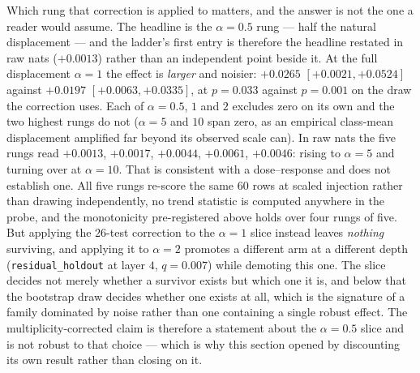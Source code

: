 Which rung that correction is applied to matters, and the answer is not the one a reader would
assume. The headline is the $\alpha = 0.5$ rung --- half the natural displacement --- and the
ladder's first entry is therefore the headline restated in raw nats ($+0.0013$) rather than an
independent point beside it. At the full displacement $\alpha = 1$ the effect is \emph{larger} and
noisier: $+0.0265$ \nolinebreak[3]$[+0.0021, +0.0524]$ against $+0.0197$
\nolinebreak[3]$[+0.0063, +0.0335]$, at $p = 0.033$ against $p = 0.001$ on the draw the correction uses. Each of $\alpha = 0.5$, $1$
and $2$ excludes zero on its own and the two highest rungs do not ($\alpha = 5$ and $10$ span zero,
as an empirical class-mean displacement amplified far beyond its observed scale can). In raw nats
the five rungs read $+0.0013$, $+0.0017$, $+0.0044$, $+0.0061$, $+0.0046$: rising to $\alpha = 5$
and turning over at $\alpha = 10$. That is consistent with a dose--response and does not establish
one. All five rungs re-score the same $60$ rows at scaled injection rather than drawing
independently, no trend statistic is computed anywhere in the probe, and the monotonicity
pre-registered above holds over four rungs of five. But applying the $26$-test correction to the
$\alpha = 1$ slice instead
leaves \emph{nothing} surviving, and applying it to $\alpha = 2$ promotes a different arm at a
different depth (\texttt{residual\_holdout} at layer $4$, $q = 0.007$) while demoting this one. The
slice decides not merely whether a survivor exists but which one it is, and below that the
bootstrap draw decides whether one exists at all, which is the signature of a
family dominated by noise rather than one containing a single robust effect. The
multiplicity-corrected claim is therefore a statement about the $\alpha = 0.5$ slice and is not
robust to that choice --- which is why this section opened by discounting its own result rather
than closing on it.

